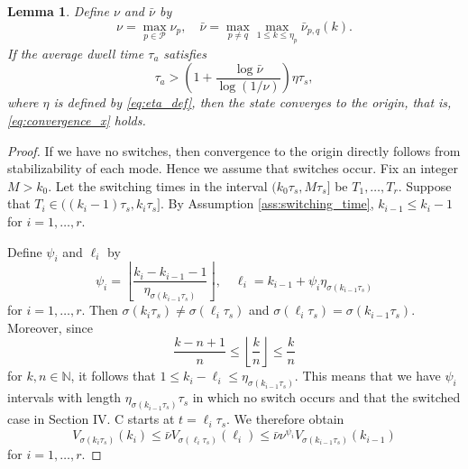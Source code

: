 \documentclass[letterpaper, 11pt, onecolumn]{ieeeconf}  \IEEEoverridecommandlockouts
\newtheorem{lemma}[theorem]{Lemma}
\begin{document}
\begin{lemma}
{\em
Define $\nu$ and $\bar \nu$ by
\begin{equation}
\label{eq:nu_bnu_def}
\nu = \max_{p \in \mathcal{P}} \nu_p,\quad
\bar \nu = \max_{p\not=q} \max_{1 \leq k \leq \eta_p}\bar \nu_{p,q}(k).
\end{equation}
If the average dwell time $\tau_a$ satisfies
\begin{equation}
\label{eq:ADT_final_condition}
\tau_a > \left( 1+
\frac{ \log \bar \nu}{\log(1/\nu)} 
\right)\eta\tau_s,
\end{equation}
where $\eta$ is defined by \eqref{eq:eta_def},
then the state converges to the origin, that is, \eqref{eq:convergence_x} holds.
}
\end{lemma}
\begin{proof}
If we have no switches, then convergence to the origin directly follows from
stabilizability of each mode. 
Hence we assume that switches occur.
Fix an integer $M > k_0$. Let the switching times in the interval $(k_0\tau_s, M\tau_s]$
be $T_1,\dots,T_r$. Suppose that $T_i \in ((k_i-1)\tau_s ,k_i\tau_s]$.
By Assumption \ref{ass:switching_time}, $k_{i-1} \leq  k_{i} - 1$
for $i=1,\dots,r$.

Define $\psi_i$ and $\ell_i$ by
\begin{equation*}
\psi_i = \left\lfloor \frac{k_i - k_{i-1} - 1}{\eta_{\sigma(k_{i-1}\tau_s)}} \right\rfloor, \quad
\ell_i = k_{i-1} + \psi_i \eta_{\sigma(k_{i-1}\tau_s)}
\end{equation*}
for $i= 1,\dots,r$. 
Then $\sigma(k_i\tau_s) \not= \sigma(\ell_i \tau_s)$ and
$\sigma(\ell_i \tau_s) = \sigma(k_{i-1}\tau_s)$. 
Moreover, since
\begin{equation}
\label{eq:ceiling_func_property}
\frac{k-n+1}{n} \leq  \left\lfloor \frac{k}{n}\right\rfloor
\leq \frac{k}{n}
\end{equation}
for $k,n \in \mathbb{N}$, it follows that 
$1 \leq k_i - \ell_i \leq \eta_{\sigma(k_{i-1}\tau_s)}$.
This means that we have $\psi_i$ intervals with length 
$\eta_{\sigma(k_{i-1}\tau_s)} \tau_s$ in which no switch occurs
and that the switched case in Section IV. C starts at $t = \ell_i \tau_s$.
We therefore obtain
\begin{equation}
\label{eq:V_switching}
V_{\sigma(k_i\tau_s)}(k_i) 
\leq \bar \nu V_{\sigma(\ell_i\tau_s)}(\ell_i )
\leq \bar \nu \nu^{\psi_i}V_{\sigma(k_{i-1}\tau_s)}(k_{i-1})
\end{equation}
for $i=1,\dots,r$.



\end{proof}
\end{document}
